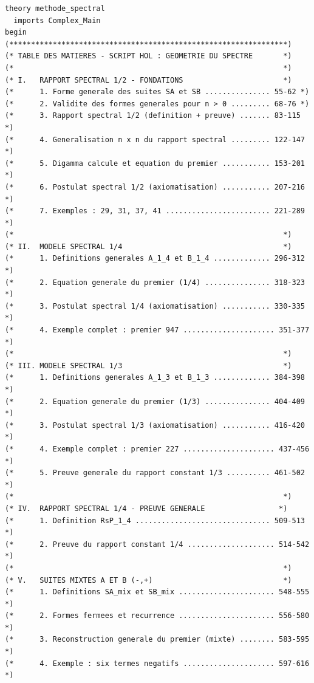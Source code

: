 \documentclass[a4paper,11pt]{article}
\begin{document}
\begin{holcode}[title={\textcolor{white}{Fichier : methode\_spectral.thy -- Partie 1/4}}]
\begin{lstlisting}
theory methode_spectral
  imports Complex_Main
begin
(****************************************************************)
(* TABLE DES MATIERES - SCRIPT HOL : GEOMETRIE DU SPECTRE       *)
(*                                                              *)
(* I.   RAPPORT SPECTRAL 1/2 - FONDATIONS                       *)
(*      1. Forme generale des suites SA et SB ............... 55-62 *)
(*      2. Validite des formes generales pour n > 0 ......... 68-76 *)
(*      3. Rapport spectral 1/2 (definition + preuve) ....... 83-115 *)
(*      4. Generalisation n x n du rapport spectral ......... 122-147 *)
(*      5. Digamma calcule et equation du premier ........... 153-201 *)
(*      6. Postulat spectral 1/2 (axiomatisation) ........... 207-216 *)
(*      7. Exemples : 29, 31, 37, 41 ........................ 221-289 *)
(*                                                              *)
(* II.  MODELE SPECTRAL 1/4                                     *)
(*      1. Definitions generales A_1_4 et B_1_4 ............. 296-312 *)
(*      2. Equation generale du premier (1/4) ............... 318-323 *)
(*      3. Postulat spectral 1/4 (axiomatisation) ........... 330-335 *)
(*      4. Exemple complet : premier 947 ..................... 351-377 *)
(*                                                              *)
(* III. MODELE SPECTRAL 1/3                                     *)
(*      1. Definitions generales A_1_3 et B_1_3 ............. 384-398 *)
(*      2. Equation generale du premier (1/3) ............... 404-409 *)
(*      3. Postulat spectral 1/3 (axiomatisation) ........... 416-420 *)
(*      4. Exemple complet : premier 227 ..................... 437-456 *)
(*      5. Preuve generale du rapport constant 1/3 .......... 461-502 *)
(*                                                              *)
(* IV.  RAPPORT SPECTRAL 1/4 - PREUVE GENERALE                 *)
(*      1. Definition RsP_1_4 ............................... 509-513 *)
(*      2. Preuve du rapport constant 1/4 .................... 514-542 *)
(*                                                              *)
(* V.   SUITES MIXTES A ET B (-,+)                              *)
(*      1. Definitions SA_mix et SB_mix ...................... 548-555 *)
(*      2. Formes fermees et recurrence ...................... 556-580 *)
(*      3. Reconstruction generale du premier (mixte) ........ 583-595 *)
(*      4. Exemple : six termes negatifs ..................... 597-616 *)

\end{lstlisting}
\end{holcode}
\end{document}
